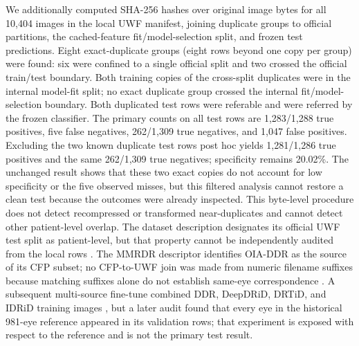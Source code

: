 \documentclass{ieeeaccess}
\begin{document}
We additionally computed SHA-256 hashes over original image bytes for all 10,404 images in the local UWF manifest, joining duplicate groups to official partitions, the cached-feature fit/model-selection split, and frozen test predictions. Eight exact-duplicate groups (eight rows beyond one copy per group) were found: six were confined to a single official split and two crossed the official train/test boundary. Both training copies of the cross-split duplicates were in the internal model-fit split; no exact duplicate group crossed the internal fit/model-selection boundary. Both duplicated test rows were referable and were referred by the frozen classifier. The primary counts on all test rows are 1,283/1,288 true positives, five false negatives, 262/1,309 true negatives, and 1,047 false positives. Excluding the two known duplicate test rows post hoc yields 1,281/1,286 true positives and the same 262/1,309 true negatives; specificity remains 20.02\%. The unchanged result shows that these two exact copies do not account for low specificity or the five observed misses, but this filtered analysis cannot restore a clean test because the outcomes were already inspected. This byte-level procedure does not detect recompressed or transformed near-duplicates and cannot detect other patient-level overlap. The dataset description designates its official UWF test split as patient-level, but that property cannot be independently audited from the local rows \cite{mmrdr,mmrdrdata}. The MMRDR descriptor identifies OIA-DDR as the source of its CFP subset; no CFP-to-UWF join was made from numeric filename suffixes because matching suffixes alone do not establish same-eye correspondence \cite{mmrdr}. A subsequent multi-source fine-tune combined DDR, DeepDRiD, DRTiD, and IDRiD training images \cite{idrid}, but a later audit found that every eye in the historical 981-eye reference appeared in its validation rows; that experiment is exposed with respect to the reference and is not the primary test result.
\end{document}

